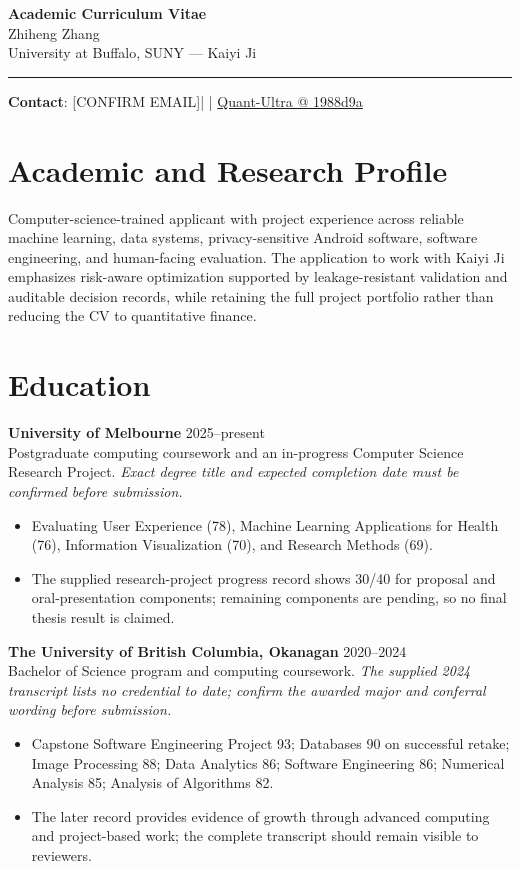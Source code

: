 \documentclass[11pt]{article}
\makeatletter
\newcommand{\ApplicantName}{Zhiheng Zhang}
\newcommand{\ApplicantEmail}{[CONFIRM EMAIL]}
\newcommand{\ApplicantPhone}{[CONFIRM PHONE]}
\newcommand{\ApplicantGitHub}{\href{https://github.com/zhiheng-zhang-Mera/Quant-Ultra/tree/1988d9a8530da91a8158de864d098ea869098923}{Quant-Ultra @ 1988d9a}}
\makeatother
\begin{document}
\begin{center}
{\LARGE\bfseries Academic Curriculum Vitae}\\[0.25em]
{\large \ApplicantName}\\
University at Buffalo, SUNY --- Kaiyi Ji
\end{center}
\vspace{0.35em}\hrule\vspace{0.65em}

\textbf{Contact}: \ApplicantEmail\quad | \quad \ApplicantPhone\quad | \quad \ApplicantGitHub

\section*{Academic and Research Profile}
Computer-science-trained applicant with project experience across reliable machine learning, data systems, privacy-sensitive Android software, software engineering, and human-facing evaluation. The application to work with Kaiyi Ji emphasizes risk-aware optimization supported by leakage-resistant validation and auditable decision records, while retaining the full project portfolio rather than reducing the CV to quantitative finance.

\section*{Education}
\textbf{University of Melbourne} \hfill 2025--present\\
Postgraduate computing coursework and an in-progress Computer Science Research Project. \textit{Exact degree title and expected completion date must be confirmed before submission.}
\begin{itemize}
\item Evaluating User Experience (78), Machine Learning Applications for Health (76), Information Visualization (70), and Research Methods (69).
\item The supplied research-project progress record shows 30/40 for proposal and oral-presentation components; remaining components are pending, so no final thesis result is claimed.
\end{itemize}

\textbf{The University of British Columbia, Okanagan} \hfill 2020--2024\\
Bachelor of Science program and computing coursework. \textit{The supplied 2024 transcript lists no credential to date; confirm the awarded major and conferral wording before submission.}
\begin{itemize}
\item Capstone Software Engineering Project 93; Databases 90 on successful retake; Image Processing 88; Data Analytics 86; Software Engineering 86; Numerical Analysis 85; Analysis of Algorithms 82.
\item The later record provides evidence of growth through advanced computing and project-based work; the complete transcript should remain visible to reviewers.
\end{itemize}
\end{document}
